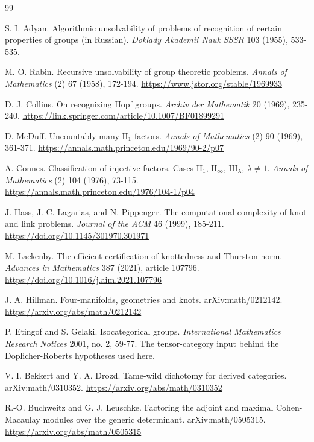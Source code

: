 \documentclass[11pt,letterpaper]{article}
\theoremstyle{definition}
\theoremstyle{remark}
\begin{document}
\begin{thebibliography}{99}
\small

S. I. Adyan. Algorithmic unsolvability of problems of recognition of certain properties of groups (in Russian). \emph{Doklady Akademii Nauk SSSR} 103 (1955), 533-535.

M. O. Rabin. Recursive unsolvability of group theoretic problems. \emph{Annals of Mathematics} (2) 67 (1958), 172-194. \url{https://www.jstor.org/stable/1969933}

D. J. Collins. On recognizing Hopf groups. \emph{Archiv der Mathematik} 20 (1969), 235-240. \url{https://link.springer.com/article/10.1007/BF01899291}

D. McDuff. Uncountably many $\mathrm{II}_1$ factors. \emph{Annals of Mathematics} (2) 90 (1969), 361-371. \url{https://annals.math.princeton.edu/1969/90-2/p07}

A. Connes. Classification of injective factors. Cases $\mathrm{II}_1$, $\mathrm{II}_\infty$, $\mathrm{III}_\lambda$, $\lambda \neq 1$. \emph{Annals of Mathematics} (2) 104 (1976), 73-115. \url{https://annals.math.princeton.edu/1976/104-1/p04}

J. Hass, J. C. Lagarias, and N. Pippenger. The computational complexity of knot and link problems. \emph{Journal of the ACM} 46 (1999), 185-211. \url{https://doi.org/10.1145/301970.301971}

M. Lackenby. The efficient certification of knottedness and Thurston norm. \emph{Advances in Mathematics} 387 (2021), article 107796. \url{https://doi.org/10.1016/j.aim.2021.107796}

J. A. Hillman. Four-manifolds, geometries and knots. arXiv:math/0212142. \url{https://arxiv.org/abs/math/0212142}

P. Etingof and S. Gelaki. Isocategorical groups. \emph{International Mathematics Research Notices} 2001, no. 2, 59-77. The tensor-category input behind the Doplicher-Roberts hypotheses used here.

V. I. Bekkert and Y. A. Drozd. Tame-wild dichotomy for derived categories. arXiv:math/0310352. \url{https://arxiv.org/abs/math/0310352}

R.-O. Buchweitz and G. J. Leuschke. Factoring the adjoint and maximal Cohen-Macaulay modules over the generic determinant. arXiv:math/0505315. \url{https://arxiv.org/abs/math/0505315}


\end{thebibliography}
\end{document}
